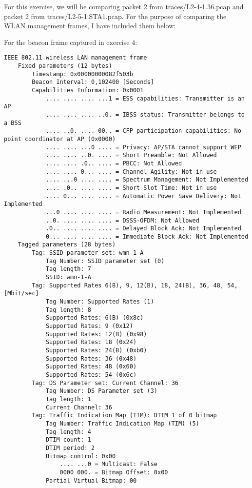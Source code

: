 For this exercise, we will be comparing packet 2 from traces/L2-4-1.36.pcap and packet 2 from traces/L2-5-1.STA1.pcap.
For the purpose of comparing the WLAN management frames, I have included them below:

For the beacon frame captured in  exercise 4:
\begin{lstlisting}
IEEE 802.11 wireless LAN management frame
    Fixed parameters (12 bytes)
        Timestamp: 0x00000000082f503b
        Beacon Interval: 0,102400 [Seconds]
        Capabilities Information: 0x0001
            .... .... .... ...1 = ESS capabilities: Transmitter is an AP
            .... .... .... ..0. = IBSS status: Transmitter belongs to a BSS
            .... ..0. .... 00.. = CFP participation capabilities: No point coordinator at AP (0x0000)
            .... .... ...0 .... = Privacy: AP/STA cannot support WEP
            .... .... ..0. .... = Short Preamble: Not Allowed
            .... .... .0.. .... = PBCC: Not Allowed
            .... .... 0... .... = Channel Agility: Not in use
            .... ...0 .... .... = Spectrum Management: Not Implemented
            .... .0.. .... .... = Short Slot Time: Not in use
            .... 0... .... .... = Automatic Power Save Delivery: Not Implemented
            ...0 .... .... .... = Radio Measurement: Not Implemented
            ..0. .... .... .... = DSSS-OFDM: Not Allowed
            .0.. .... .... .... = Delayed Block Ack: Not Implemented
            0... .... .... .... = Immediate Block Ack: Not Implemented
    Tagged parameters (28 bytes)
        Tag: SSID parameter set: wmn-1-A
            Tag Number: SSID parameter set (0)
            Tag length: 7
            SSID: wmn-1-A
        Tag: Supported Rates 6(B), 9, 12(B), 18, 24(B), 36, 48, 54, [Mbit/sec]
            Tag Number: Supported Rates (1)
            Tag length: 8
            Supported Rates: 6(B) (0x8c)
            Supported Rates: 9 (0x12)
            Supported Rates: 12(B) (0x98)
            Supported Rates: 18 (0x24)
            Supported Rates: 24(B) (0xb0)
            Supported Rates: 36 (0x48)
            Supported Rates: 48 (0x60)
            Supported Rates: 54 (0x6c)
        Tag: DS Parameter set: Current Channel: 36
            Tag Number: DS Parameter set (3)
            Tag length: 1
            Current Channel: 36
        Tag: Traffic Indication Map (TIM): DTIM 1 of 0 bitmap
            Tag Number: Traffic Indication Map (TIM) (5)
            Tag length: 4
            DTIM count: 1
            DTIM period: 2
            Bitmap control: 0x00
                .... ...0 = Multicast: False
                0000 000. = Bitmap Offset: 0x00
            Partial Virtual Bitmap: 00
\end{lstlisting}
